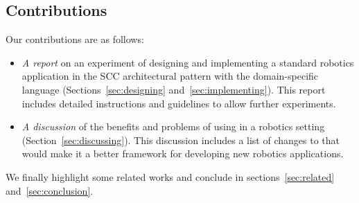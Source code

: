 \subsection*{Contributions}

Our contributions are as follows:

\begin{itemize}
\item \emph{A report} on an experiment of designing and implementing a
  standard robotics application in the SCC architectural pattern with
  the \diaspec{} domain-specific language
  (Sections~\ref{sec:designing} and~\ref{sec:implementing}). This
  report includes detailed instructions and guidelines to allow
  further experiments.
\item \emph{A discussion} of the benefits and problems of using
  \diaspec{} in a robotics setting (Section~\ref{sec:discussing}).
  This discussion includes a list of changes to \diaspec{} that would
  make it a better framework for developing new robotics applications.
\end{itemize}

We finally highlight some related works and conclude in
sections~\ref{sec:related} and~\ref{sec:conclusion}.




